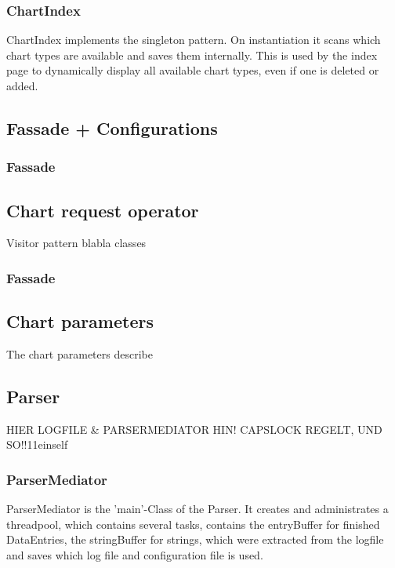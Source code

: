 \subsubsection*{ChartIndex}
ChartIndex implements the singleton pattern. On instantiation it scans which chart types are available 
and saves them internally. This is used by the index page to dynamically display all available chart types,
even if one is deleted or added.

\subsection{Fassade + Configurations}
\subsubsection{Fassade}


\subsection{Chart request operator}
Visitor pattern blabla   %
classes
\subsubsection{Fassade}

\subsection{Chart parameters}
The chart parameters describe %

\subsection{}


\subsection{Parser}

HIER LOGFILE \& PARSERMEDIATOR HIN!
CAPSLOCK REGELT, UND SO!!11einself %

\subsubsection*{ParserMediator}
ParserMediator is the 'main'-Class of the Parser. It creates and administrates a threadpool, which contains several tasks, 
contains the entryBuffer for finished DataEntries, the stringBuffer for strings, which were extracted
from the logfile and saves which log file and configuration file is used.


